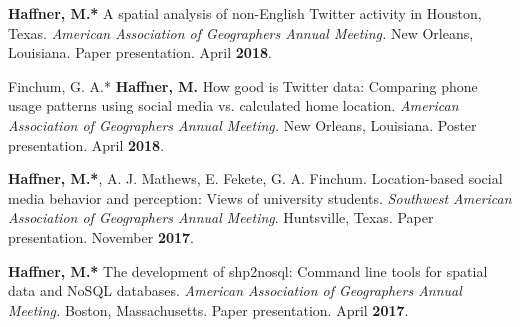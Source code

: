 \begin{cventries}
   \cventry
      {}
      {}
      {}
      {}
      {
        \begin{cvitems}
          \vspace{-2mm}
        \item {\textbf{Haffner, M.*} A spatial analysis of non-English Twitter
            activity in Houston, Texas.
             \textit{American Association of Geographers Annual Meeting.} New Orleans, Louisiana.
            Paper presentation. April \textbf{2018}.}
          \end{cvitems}
        } %

   \cventry
      {}
      {}
      {}
      {}
      {
        \begin{cvitems}
          \vspace{-2mm}
        \item {Finchum, G. A.* \textbf{Haffner, M.} How good is Twitter data:
            Comparing phone usage patterns using social media vs. calculated
            home location.
             \textit{American Association of Geographers Annual Meeting.} New Orleans, Louisiana.
            Poster presentation. April \textbf{2018}.}
          \end{cvitems}
        } %

   \cventry
      {}
      {}
      {}
      {}
      {
        \begin{cvitems}
          \vspace{-2mm}
        \item {\textbf{Haffner, M.*}, A. J. Mathews, E. Fekete, G. A. Finchum.
            Location-based social media behavior and perception: Views of
            university students. \textit{Southwest American Association of
              Geographers Annual Meeting}. Huntsville, Texas. Paper
            presentation. November \textbf{2017}.}
          \end{cvitems}
        } %

   \cventry
      {}
      {}
      {}
      {}
      {
        \begin{cvitems}
          \vspace{-2mm}
        \item {\textbf{Haffner, M.*} The development of shp2nosql: Command line
            tools for spatial data and NoSQL databases. \textit{American
            Association of Geographers Annual Meeting.} Boston, Massachusetts.
            Paper presentation. April \textbf{2017}.}
          \end{cvitems}
        } %


\end{cventries}
